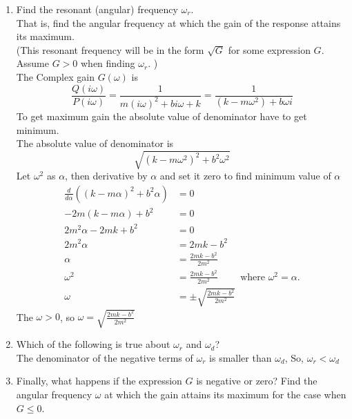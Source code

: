 \begin{enumerate}
\item Find the resonant (angular) frequency $\omega_ r$.\\
  That is, find the angular frequency at which the gain of the response attains its maximum. \\
  (This resonant frequency will be in the form $\sqrt{G}$
  for some expression $G$. Assume $G>0$ when finding $\omega _r$. )\\
  The Complex gain $G(\omega)$ is
  \begin{equation*}
    \frac{Q(i \omega)}{P(i \omega)}
    = \frac{1}{m (i \omega)^2 + b i \omega + k}
    = \frac{1}{(k - m \omega ^2) + b \omega i}
  \end{equation*}
  To get maximum gain the absolute value of denominator have to get minimum. \\
  The absolute value of denominator is
  \begin{equation*}
    \sqrt{(k - m \omega ^2)^2 + b^2 \omega^2}
  \end{equation*}
  Let $\omega ^2$ as $\alpha$, then derivative by $\alpha$ and set it zero to find minimum value of $\alpha$
  \begin{align*}
    \frac{d}{d \alpha} \left( (k - m \alpha)^2 + b^2 \alpha \right) &= 0 \\
    -2m(k - m \alpha) + b^2 &= 0 \\
    2m^2 \alpha - 2mk + b^2 &= 0 \\
    2m^2 \alpha &= 2mk - b^2\\
    \alpha &= \frac{2mk - b^2}{2m^2} \\
    \omega ^2 &= \frac{2mk - b^2}{2m^2} \qquad \text{ where } \omega ^2 = \alpha. \\
    \omega &= \pm \sqrt{\frac{2mk - b^2}{2m^2}}
  \end{align*}
  The $\omega > 0$, so $\omega = \sqrt{\frac{2mk - b^2}{2m^2}}$

\item Which of the following is true about $\omega_ r$ and $\omega_ d$?\\

  The denominator of the negative terms of $\omega _r$ is smaller than $\omega _d$,
  So, $\omega _ r < \omega _ d$
  \clearpage
  
\item Finally, what happens if the expression $G$ is negative or zero?
  Find the angular frequency $\omega$ at which the gain attains
  its maximum for the case when $G≤0$.\\


\end{enumerate}
